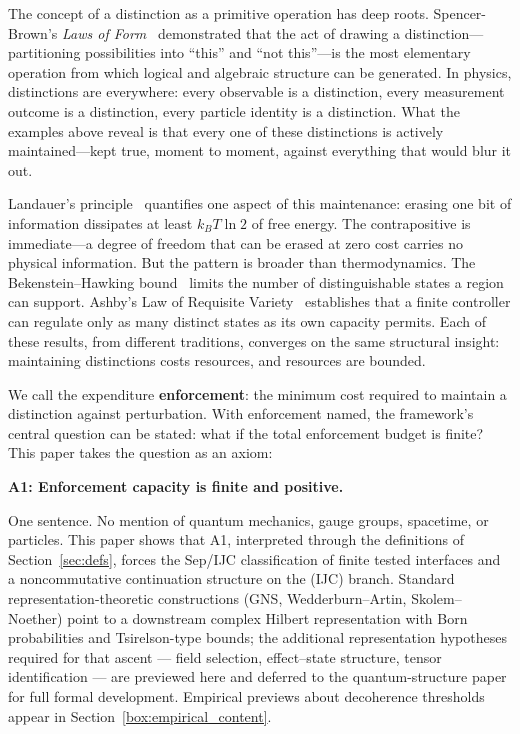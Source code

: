 \documentclass[11pt]{article}
\theoremstyle{remark}
\begin{document}
The concept of a distinction as a primitive operation has deep roots.  Spencer-Brown's \emph{Laws of Form}~\cite{SpencerBrown1969} demonstrated that the act of drawing a distinction---partitioning possibilities into ``this'' and ``not this''---is the most elementary operation from which logical and algebraic structure can be generated.  In physics, distinctions are everywhere: every observable is a distinction, every measurement outcome is a distinction, every particle identity is a distinction.  What the examples above reveal is that every one of these distinctions is actively maintained---kept true, moment to moment, against everything that would blur it out.

Landauer's principle~\cite{Landauer1961} quantifies one aspect of this maintenance: erasing one bit of information dissipates at least $k_BT\ln 2$ of free energy.  The contrapositive is immediate---a degree of freedom that can be erased at zero cost carries no physical information.  But the pattern is broader than thermodynamics.  The Bekenstein--Hawking bound~\cite{Bekenstein1981} limits the number of distinguishable states a region can support.  Ashby's Law of Requisite Variety~\cite{Ashby1956} establishes that a finite controller can regulate only as many distinct states as its own capacity permits.  Each of these results, from different traditions, converges on the same structural insight: maintaining distinctions costs resources, and resources are bounded.

We call the expenditure \textbf{enforcement}: the minimum cost required to maintain a distinction against perturbation.  With enforcement named, the framework's central question can be stated: what if the total enforcement budget is finite?  This paper takes the question as an axiom:

\begin{center}
\textbf{A1: Enforcement capacity is finite and positive.}
\end{center}

\noindent One sentence.  No mention of quantum mechanics, gauge groups, spacetime, or particles.  This paper shows that A1, interpreted through the definitions of Section~\ref{sec:defs}, forces the Sep/IJC classification of finite tested interfaces and a noncommutative continuation structure on the (IJC) branch.  Standard representation-theoretic constructions (GNS, Wedderburn--Artin, Skolem--Noether) point to a downstream complex Hilbert representation with Born probabilities and Tsirelson-type bounds; the additional representation hypotheses required for that ascent --- field selection, effect--state structure, tensor identification --- are previewed here and deferred to the quantum-structure paper for full formal development.  Empirical previews about decoherence thresholds appear in Section~\ref{box:empirical_content}.
\end{document}

